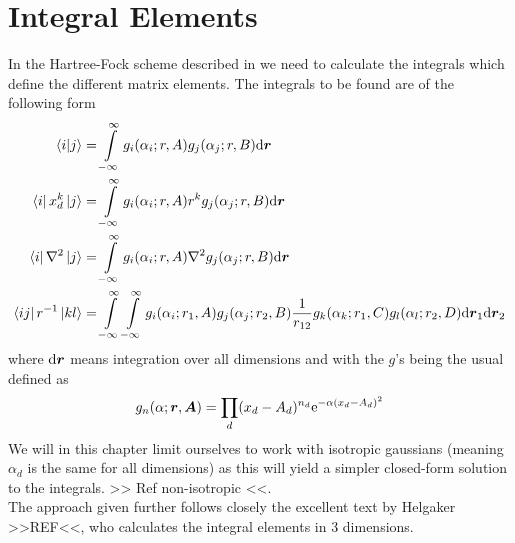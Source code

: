 
\section{Integral Elements}
    In the Hartree-Fock scheme described in  we need to
    calculate the integrals which define the different matrix elements. The
    integrals to be found are of the following form
        \begin{equation}
            \begin{aligned}
                \braket{i}{j} &= \int\limits^{\infty}_{-\infty} g_i(\alpha_i;r,A)g_j(\alpha_j;r,B) \mathrm{d}
                \boldsymbol{{r}} \\
                \bra{i}x^k_d\ket{j} &= \int\limits^{\infty}_{-\infty} g_i(\alpha_i;r,A) r^k
                g_j(\alpha_j;r,B) \mathrm{d} \boldsymbol{{r}} \\
                \bra{i}\nabla^2\ket{j} &= \int\limits^{\infty}_{-\infty} g_i(\alpha_i;r,A)\nabla^2
                g_j(\alpha_j;r,B) \mathrm{d} \boldsymbol{{r}} \\
                \bra{ij}r^{-1}\ket{kl} &= \int\limits^{\infty}_{-\infty}\int\limits^{\infty}_{-\infty}
                g_i(\alpha_i;r_1,A)g_j(\alpha_j;r_2,B) \frac{1}{r_{12}}
                g_k(\alpha_k;r_1,C)g_l(\alpha_l;r_2,D) \mathrm{d} \boldsymbol{{r}}_1 \mathrm{d}
                \boldsymbol{{r}}_2\\
            \end{aligned}
        \end{equation}
    where $\mathrm{d}\boldsymbol{{r}}$ means integration over all dimensions and with the
    $g$'s being the usual  defined as
        \begin{equation}
            g_n(\alpha;\boldsymbol{{r}},\boldsymbol{{A}}) = \prod_d (x_d-A_d)^{n_d}
            \mathrm{e}^{-\alpha (x_d-A_d)^2}
            \label{eq:hermiteGauss2}
        \end{equation}
    We will in this chapter limit ourselves to work with isotropic gaussians
    (meaning $\alpha_d$ is the same for all dimensions) as this will yield a
    simpler closed-form solution to the integrals. >> Ref non-isotropic <<. \\
    The approach given further follows closely the excellent text by Helgaker
    >>REF<<, who calculates the integral elements in 3 dimensions.

